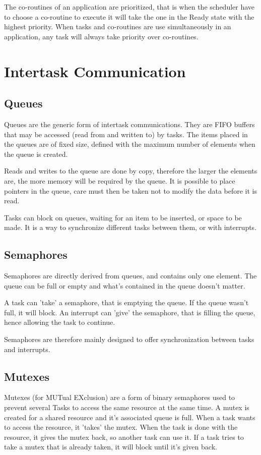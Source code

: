\documentclass[11pt]{report}
\begin{document}
The co-routines of an application are prioritized, that is when the scheduler have to choose a co-routine to execute it will take the one in the Ready state with the highest priority. When tasks and co-routines are use simultaneously in an application, any task will always take priority over co-routines. 

\section{Intertask Communication}
\subsection{Queues}

Queues are the generic form of intertask communications. They are FIFO buffers that may be accessed (read from and written to) by tasks. The items placed in the queues are of fixed size, defined with the maximum number of elements when the queue is created.

Reads and writes to the queue are done by copy, therefore the larger the elements are, the more memory will be required by the queue. It is possible to place pointers in the queue, care must then be taken not to modify the data before it is read.

Tasks can block on queues, waiting for an item to be inserted, or space to be made. It is a way to synchronize different tasks between them, or with interrupts.

\subsection{Semaphores}
Semaphores are directly derived from queues, and contains only one element. The queue can be full or empty and what's contained in the queue doesn't matter.

A task can 'take' a semaphore, that is emptying the queue. If the queue wasn't full, it will block. An interrupt can 'give' the semaphore, that is filling the queue, hence allowing the task to continue.

Semaphores are therefore mainly designed to offer synchronization between tasks and interrupts.

\subsection{Mutexes}

Mutexes (for MUTual EXclusion) are a form of binary semaphores used to prevent several Tasks to access the same resource at the same time. A mutex is created for a shared resource and it's associated queue is full. When a task wants to access the resource, it 'takes' the mutex. When the task is done with the resource, it gives the mutex back, so another task can use it. If a task tries to take a mutex that is already taken, it will block until it's given back.
\end{document}

